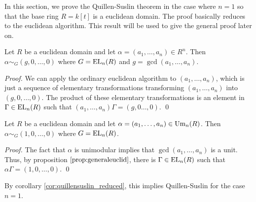 In this section, we prove the Quillen-Suslin theorem in the case where $n=1$ so that the base ring $R=k[t]$ is a euclidean domain.
The proof basically reduces to the euclidean algorithm.
This result will be used to give the general proof later on.

\begin{proposition}
\label{prop:generaleuclid}
  Let $R$ be a euclidean domain and let $\alpha = (a_1, \dots, a_n) \in R^n$.
  Then $\alpha \sim_G (g,0,\dots,0)$ where $G = \text{EL}_n(R)$ and $g = \gcd(a_1, \dots, a_n)$.
\end{proposition}
\begin{proof}
  We can apply the ordinary euclidean algorithm to $(a_1, \dots, a_n)$, which is just a sequence
  of elementary transformations transforming $(a_1, \dots, a_n)$ into $(g,0,\dots,0)$.
  The product of these elementary transformations is an element in $\Gamma \in \text{EL}_n(R)$ such
  that $(a_1, \dots, a_n) \Gamma = (g, 0 \dots, 0)$.
  \qed
\end{proof}

\begin{corollary}
\label{cor:quillensuslin_euclidean}
  Let $R$ be a euclidean domain and let $\alpha = (a_1, \dots, a_n) \in \text{Um}_n(R)$.
  Then $\alpha \sim_G (1,0,\dots,0)$ where $G = \text{EL}_n(R)$.
\end{corollary}
\begin{proof}
  The fact that $\alpha$ is unimodular implies that $\gcd(a_1, \dots, a_n)$ is a unit.
  Thus, by proposition $\ref{prop:generaleuclid}$, there is $\Gamma \in \text{EL}_n(R)$ such that
  $\alpha \Gamma = (1, 0, \dots, 0)$.
  \qed
\end{proof}

By corollary \ref{cor:quillensuslin_reduced}, this implies Quillen-Suslin for the case $n=1$.
